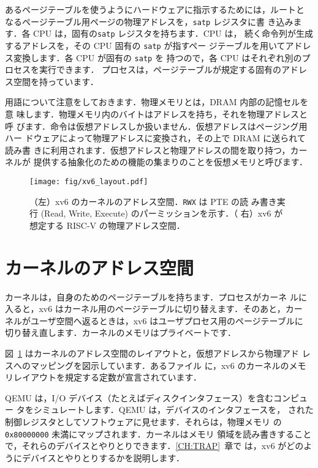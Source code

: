 あるページテーブルを使うようにハードウェアに指示するためには，ルートと
なるページテーブル用ページの物理アドレスを，\texttt{satp} レジスタに書
き込みます．各 CPU は，固有の\texttt{satp} レジスタを持ちます．CPU は，
続く命令列が生成するアドレスを，その CPU 固有の \texttt{satp} が指すペー
ジテーブルを用いてアドレス変換します．各 CPU が固有の \texttt{satp} を
持つので，各 CPU はそれぞれ別のプロセスを実行できます．
プロセスは，ページテーブルが規定する固有のアドレス空間を持っています．

用語について注意をしておきます．物理メモリとは，DRAM 内部の記憶セルを意
味します．物理メモリ内のバイトはアドレスを持ち，それを物理アドレスと呼
びます．命令は仮想アドレスしか扱いません．仮想アドレスはページング用ハー
ドウェアによって物理アドレスに変換され，その上で DRAM に送られて読み書
きに利用されます．仮想アドレスと物理アドレスの間を取り持つ，カーネルが
提供する抽象化のための機能の集まりのことを仮想メモリと呼びます．


\begin{figure}[h]
\centering
 \texttt{[image: fig/xv6\_layout.pdf]}
\caption{（左）xv6 のカーネルのアドレス空間．\texttt{RWX} は PTE の読
み書き実行 (Read, Write, Execute) のパーミッションを示す．（
右）xv6 が想定する RISC-V の物理アドレス空間．}
\label{fig:xv6_layout}
\end{figure}

\section{カーネルのアドレス空間}
カーネルは，自身のためのページテーブルを持ちます．プロセスがカーネ
ルに入ると，xv6 はカーネル用のページテーブルに切り替えます．そのあと，カー
ネルがユーザ空間へ返るときは，xv6 はユーザプロセス用のページテーブルに
切り替え直します．カーネルのメモリはプライベートです．

図~\ref{fig:xv6_layout} はカーネルのアドレス空間のレイアウトと，仮想アドレスから物理アド
レスへのマッピングを図示しています．あるファイル 
に，xv6 のカーネルのメモリレイアウトを規定する定数が宣言されています．

QEMU は，I/O デバイス（たとえばディスクインタフェース）を含むコンピュー
タをシミュレートします．QEMU は，デバイスのインタフェースを，
された制御レジスタとしてソフトウェアに見せます．それらは，物理メモリ
の \texttt{0x80000000} 未満にマップされます．カーネルはメモリ
領域を読み書きすることで，それらのデバイスとやりとりできます．\ref{CH:TRAP}~章で
は，xv6 がどのようにデバイスとやりとりするかを説明します．

